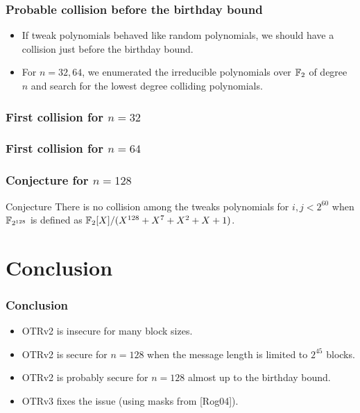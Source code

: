 \documentclass{beamer}
\begin{document}
				\begin{frame}
					\frametitle{Probable collision before the birthday bound}

					\begin{itemize}
						\item If tweak polynomials behaved like random polynomials, we should have a collision just before the birthday bound.
			
						\item For $n = 32, 64$, we enumerated the irreducible polynomials over $\mathbb{F}_2$ of degree $n$ and search for the lowest degree colliding polynomials.
					\end{itemize}
		
				\end{frame}



				\begin{frame}
					\frametitle{First collision for $n=32$}
		
					\centering
					\scalebox{0.8}{
					
					}
				\end{frame}
				\begin{frame}
					\frametitle{First collision for $n=64$}
		
					\centering
					\scalebox{0.8}{
					
					}
				\end{frame}


				\begin{frame}
					\frametitle{Conjecture for $n=128$}
		
					\begin{block}{Conjecture}
						There is no collision among the tweaks polynomials for $i, j < 2^{60}$ when $\mathbb{F}_{2^{128}}$ is defined as $\mathbb{F}_2[X]/(X^{128}+X^{7}+X^{2}+X+1)$.
					\end{block}
				\end{frame}


				\section*{Conclusion} %
				\label{sec:conclusion}

				\begin{frame}
					\frametitle{Conclusion}
		
					\begin{itemize}
						\item OTRv2 is insecure for many block sizes.
						\item OTRv2 is secure for $n = 128$ when the message length is limited to $2^{45}$ blocks.
						\item OTRv2 is probably secure for $n = 128$ almost up to the birthday bound.
						\item OTRv3 fixes the issue (using masks from [Rog04]).
					\end{itemize}
				\end{frame}
\end{document}
